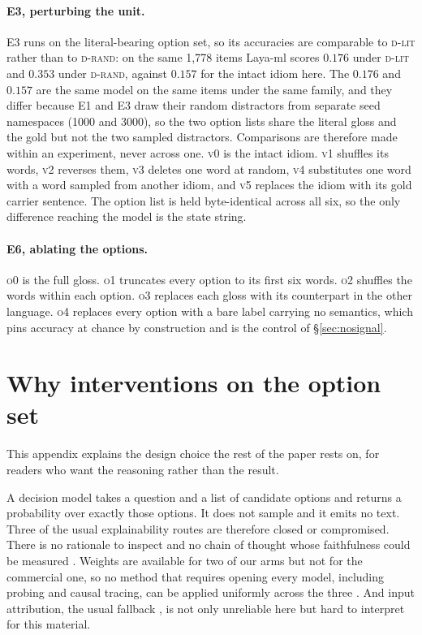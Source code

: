 \documentclass[11pt]{article}
\newcommand{\Drand}{\textsc{d-rand}}
\newcommand{\Dlit}{\textsc{d-lit}}
\begin{document}
\paragraph{E3, perturbing the unit.} E3 runs on the literal-bearing option set,
so its accuracies are comparable to \Dlit{} rather than to \Drand: on the same
1{,}778 items Laya-ml scores $0.176$ under \Dlit{} and $0.353$ under \Drand,
against $0.157$ for the intact idiom here. The $0.176$ and $0.157$ are the same
model on the same items under the same family, and they differ because E1 and E3
draw their random distractors from separate seed namespaces (1000 and 3000), so
the two option lists share the literal gloss and the gold but not the two sampled
distractors. Comparisons are therefore made within an experiment, never across
one. \textsc{v0} is the intact idiom.
\textsc{v1} shuffles its words, \textsc{v2} reverses them, \textsc{v3} deletes
one word at random, \textsc{v4} substitutes one word with a word sampled from
another idiom, and \textsc{v5} replaces the idiom with its gold carrier
sentence. The option list is held byte-identical across all six, so the only
difference reaching the model is the state string.

\paragraph{E6, ablating the options.} \textsc{o0} is the full gloss. \textsc{o1}
truncates every option to its first six words. \textsc{o2} shuffles the words
within each option. \textsc{o3} replaces each gloss with its counterpart in the
other language. \textsc{o4} replaces every option with a bare label carrying no
semantics, which pins accuracy at chance by construction and is the control of
\S\ref{sec:nosignal}.

\section{Why interventions on the option set}
\label{app:why}

This appendix explains the design choice the rest of the paper rests on, for
readers who want the reasoning rather than the result.

A decision model takes a question and a list of candidate options and returns a
probability over exactly those options. It does not sample and it emits no text. Three of the usual explainability routes are
therefore closed or compromised. There is no rationale to inspect and no chain of thought whose
faithfulness could be measured \citep{jacovi2020faithfulness,turpin2023unfaithful}.
Weights are available for two of our arms but not for the commercial one, so no
method that requires opening every model, including probing and causal tracing,
can be applied uniformly across the three \citep{oh2026tug}. And input attribution, the usual
fallback \citep{ribeiro2016lime,lundberg2017shap}, is not only unreliable here
\citep{jain2019attention,adebayo2018sanity,hooker2019roar} but hard to interpret
for this material.
\end{document}
